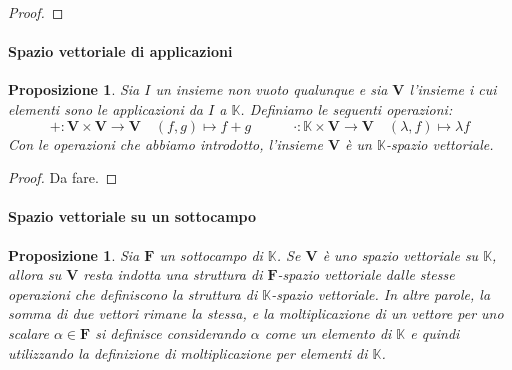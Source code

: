 \documentclass{article}
\theoremstyle{plain}
\newtheorem{prop}[thm]{Proposizione}
\theoremstyle{definition}
\theoremstyle{remark}
\begin{document}
\begin{proof}
%
%
\end{proof}

\vspace{10pt}

\paragraph{Spazio vettoriale di applicazioni}
\begin{bxthm}
\begin{prop}\label{exmp:uno}
    Sia \( I \) un insieme non vuoto qualunque e sia \( \mathbf{V} \) l'insieme i cui elementi sono le applicazioni da $I$ a $\mathbb{K}$.
    Definiamo le seguenti operazioni:
    \[ +:\mathbf{V}\times \mathbf{V}\to\mathbf{V}\quad (f,g)\mapsto f+g \quad\quad\quad \cdot:\mathbb{K}\times\mathbf{V}\to \mathbf{V}\quad (\lambda,f)\mapsto\lambda f\]
    Con le operazioni che abbiamo introdotto, l'insieme \( \mathbf{V} \) è un \( \mathbb{K} \)-spazio vettoriale.
\end{prop}
\end{bxthm}
\begin{proof}
    Da fare.
\end{proof}

\vspace{10pt}

\paragraph{Spazio vettoriale su un sottocampo}
\begin{bxthm}
\begin{prop}
    Sia \( \mathbf{F} \) un sottocampo di \( \mathbb{K} \). Se \( \mathbf{V} \) è uno spazio vettoriale su \( \mathbb{K} \), allora su \( \mathbf{V} \) resta indotta una struttura di \( \mathbf{F} \)-spazio vettoriale dalle stesse operazioni che definiscono la struttura di \( \mathbb{K} \)-spazio vettoriale. 
    In altre parole, la somma di due vettori rimane la stessa, e la moltiplicazione di un vettore per uno scalare \( \alpha \in \mathbf{F} \) si definisce considerando \( \alpha \) come un elemento di \( \mathbb{K} \) e quindi utilizzando la definizione di moltiplicazione per elementi di \( \mathbb{K} \).
\end{prop}
\end{bxthm}
\end{document}
